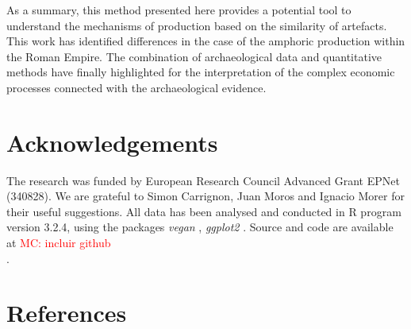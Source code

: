 \documentclass[review]{elsarticle}
\newcommand{\memo}[2]{\textcolor{#1}{#2}}
\newcommand{\maria}[1]{\memo{red}{MC: #1\\}}
\begin{document}
As a summary, this method presented here provides a potential tool to understand the mechanisms of production based on the similarity of artefacts. This work has identified differences in the case of the amphoric production within the Roman Empire. The combination of archaeological data and quantitative methods have finally highlighted for the interpretation of the complex economic processes connected with the archaeological evidence. 


\section{Acknowledgements}

The research was funded by European Research Council Advanced Grant EPNet (340828). We are grateful to Simon Carrignon, Juan Moros and Ignacio Morer for their useful suggestions.  
All data has been analysed and conducted in R program version 3.2.4, using the packages \textit{vegan} \citep{oksanen_vegan_2007}, \textit{ggplot2} \citep{ggplot2:_2016}. Source and code are available at \maria{incluir github}. 


\section{References}

%

\end{document}
